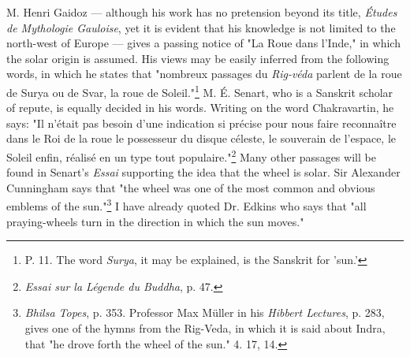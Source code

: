 \documentclass[a4paper, 11pt, oneside, polutonikogreek, english]{article}
\begin{document}
M. Henri Gaidoz --- although his work has no pretension beyond its title, \emph{Études de Mythologie Gauloise}, yet it is evident that his knowledge is not limited to the north-west of Europe --- gives a passing notice of "La Roue dans l'Inde," in which the solar origin is assumed. His views may be easily inferred from the following words, in which he states that "nombreux passages du \emph{Rig-véda} parlent de la roue de Surya ou de Svar, la roue de Soleil."\footnote{P. 11. The word \emph{Surya}, it may be explained, is the Sanskrit for 'sun.'} M. É. Senart, who is a Sanskrit scholar of repute, is equally decided in his words. Writing on the word Chakravartin, he says: "Il n'était pas besoin d'une indication si précise pour nous faire reconnaître dans le Roi de la roue le possesseur du disque céleste, le souverain de l'espace, le Soleil enfin, réalisé en un type tout populaire."\footnote{\emph{Essai sur la Légende du Buddha}, p. 47.} Many other passages will be found in Senart's \emph{Essai} supporting the idea that the wheel is solar. Sir Alexander Cunningham says that "the wheel was one of the most common and obvious emblems of the sun."\footnote{\emph{Bhilsa Topes}, p. 353. Professor Max Müller in his \emph{Hibbert Lectures}, p. 283, gives one of the hymns from the Rig-Veda, in which it is said about Indra, that "he drove forth the wheel of the sun." 4. 17, 14.} I have already quoted Dr. Edkins who says that "all praying-wheels turn in the direction in which the sun moves."
\end{document}
